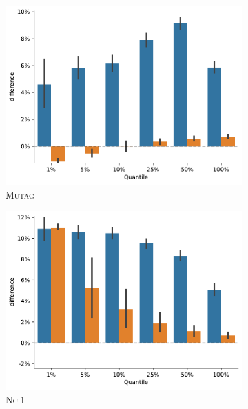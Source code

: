 \begin{figure}[H]
\begin{subfigure}[b]{0.3\textwidth}
		\centering
		\includegraphics[width=\textwidth]{Figures/train_test_diff_MUTAG.pdf}
		\vspace*{-4ex} 
		\caption{\textsc{Mutag}}
	\end{subfigure}
	\par\bigskip
	\begin{subfigure}[b]{0.3\textwidth}
		\centering
		\includegraphics[width=\textwidth]{Figures/train_test_diff_NCI1.pdf}
		\vspace*{-4ex} 
		\caption{\textsc{Nci1}}
	\end{subfigure}
	\hfill
	\begin{subfigure}[b]{0.3\textwidth}
		\centering

\end{subfigure}
\end{figure}
